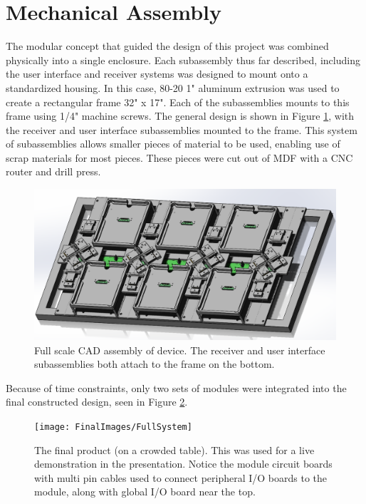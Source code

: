 
\section{Mechanical Assembly}

	The modular concept that guided the design of this project was combined physically into a single enclosure.  Each subassembly thus far described, including the user interface and receiver systems was designed to mount onto a standardized housing.  In this case, 80-20 1" aluminum extrusion was used to create a rectangular frame 32" x 17".  Each of the subassemblies mounts to this frame using 1/4" machine screws.  The general design is shown in Figure \ref{fig:fullASM}, with the receiver and user interface subassemblies mounted to the frame.  This system of subassemblies allows smaller pieces of material to be used, enabling use of scrap materials for most pieces.  These pieces were cut out of MDF with a CNC router and drill press.

	\begin{figure}
		\centering
		\includegraphics[width = \textwidth]{PR5Images/FullAsmCAD.png}
		\caption{Full scale CAD assembly of device.  The receiver and user interface subassemblies both attach to the frame on the bottom.}
		\label{fig:fullASM}
	\end{figure}

	Because of time constraints, only two sets of modules were integrated into the final constructed design, seen in Figure \ref{fig:fullsystemim}.

	\begin{figure}
		\centering
		\texttt{[image: FinalImages/FullSystem]}
		\caption{The final product (on a crowded table).  This was used for a live demonstration in the presentation.  Notice the module circuit boards with multi pin cables used to connect peripheral I/O boards to the module, along with global I/O board near the top.}
		\label{fig:fullsystemim}
	\end{figure}



